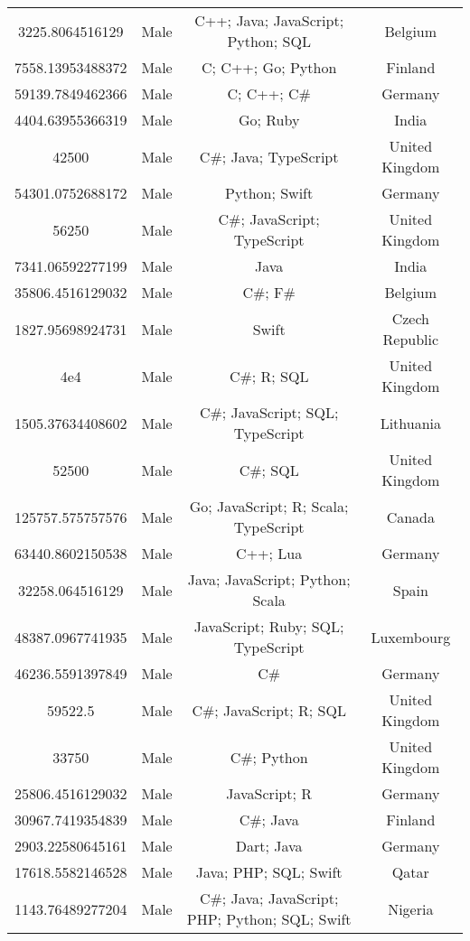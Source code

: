 \begin{center}
\begin{tabular}{ |c|c|c|c| }
3225.8064516129  &  Male  &  C++; Java; JavaScript; Python; SQL  &  Belgium  \\ 
7558.13953488372  &  Male  &  C; C++; Go; Python  &  Finland  \\ 
59139.7849462366  &  Male  &  C; C++; C\#  &  Germany  \\ 
4404.63955366319  &  Male  &  Go; Ruby  &  India  \\ 
42500  &  Male  &  C\#; Java; TypeScript  &  United Kingdom  \\ 
54301.0752688172  &  Male  &  Python; Swift  &  Germany  \\ 
56250  &  Male  &  C\#; JavaScript; TypeScript  &  United Kingdom  \\ 
7341.06592277199  &  Male  &  Java  &  India  \\ 
35806.4516129032  &  Male  &  C\#; F\#  &  Belgium  \\ 
1827.95698924731  &  Male  &  Swift  &  Czech Republic  \\ 
4e4  &  Male  &  C\#; R; SQL  &  United Kingdom  \\ 
1505.37634408602  &  Male  &  C\#; JavaScript; SQL; TypeScript  &  Lithuania  \\ 
52500  &  Male  &  C\#; SQL  &  United Kingdom  \\ 
125757.575757576  &  Male  &  Go; JavaScript; R; Scala; TypeScript  &  Canada  \\ 
63440.8602150538  &  Male  &  C++; Lua  &  Germany  \\ 
32258.064516129  &  Male  &  Java; JavaScript; Python; Scala  &  Spain  \\ 
48387.0967741935  &  Male  &  JavaScript; Ruby; SQL; TypeScript  &  Luxembourg  \\ 
46236.5591397849  &  Male  &  C\#  &  Germany  \\ 
59522.5  &  Male  &  C\#; JavaScript; R; SQL  &  United Kingdom  \\ 
33750  &  Male  &  C\#; Python  &  United Kingdom  \\ 
25806.4516129032  &  Male  &  JavaScript; R  &  Germany  \\ 
30967.7419354839  &  Male  &  C\#; Java  &  Finland  \\ 
2903.22580645161  &  Male  &  Dart; Java  &  Germany  \\ 
17618.5582146528  &  Male  &  Java; PHP; SQL; Swift  &  Qatar  \\ 
1143.76489277204  &  Male  &  C\#; Java; JavaScript; PHP; Python; SQL; Swift  &  Nigeria  \\ 

\end{tabular}
\end{center}
